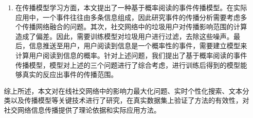 \begin{cabstract}
\begin{enumerate}
	\item 在传播模型学习方面，本文提出了一种基于概率阅读的事件传播模型。在实际应用中，一个事件往往由多条信息组成，因此研究事件的传播分析需要考虑多个传播网络融合的问题。其次，社交网络中的垃圾用户对传播影响范围的计算造成了偏差。因此，需要训练模型对垃圾用户进行过滤，去除这些噪声。最后，信息推送至用户，用户阅读到信息是一个概率性的事件，需要建立模型来计算用户阅读到信息的概率。针对上述问题，我们提出了基于概率阅读的事件传播模型，模型对上述的三个问题进行了综合考虑，进行训练后得到的模型能够真实的反应出事件的传播范围。
\end{enumerate}

综上所述，本文对在线社交网络中的影响力最大化问题、实时个性化搜索、文本分类以及传播模型等关键技术进行了研究，在真实数据集上验证了方法的有效性，对社交网络信息传播提供了理论依据和实际应用方法。
\end{cabstract}

